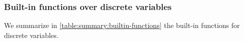 %
%




\subsubsection{Built-in functions over discrete variables}\label{section:builtin-functions}

We summarize in \cref{table:summary:builtin-functions} the built-in functions for discrete variables.

